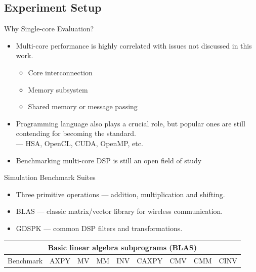 \documentclass{beamer}
\begin{document}
\begin{CJK}{UTF8}{bkai}
    \subsection{Experiment Setup}
    \begin{frame}{Why Single-core Evaluation?}
        \begin{itemize}
            \item Multi-core performance is highly correlated with issues not discussed in this work.
                \begin{itemize}
                    \item Core interconnection
                    \item Memory subsystem 
                    \item Shared memory or message passing
                \end{itemize}
            \item Programming language also plays a crucial role, but popular ones are still contending for becoming the standard. \\
                    --- HSA, OpenCL, CUDA, OpenMP, etc.
                \item Benchmarking multi-core DSP is still an open field of study~\cite{landscape}
        \end{itemize}       
    \end{frame}
    \begin{frame}{Simulation Benchmark Suites}
        \begin{itemize}
            \item Three primitive operations --- addition, multiplication and shifting.
            \item BLAS --- classic matrix/vector library for wireless communication.
            \item GDSPK --- common DSP filters and transformations.
        \end{itemize}
            \begin{table}[!ht]
                \centering
                \resizebox{\columnwidth}{!}
                {
                    \begin{tabular}{|c|c|c|c|c|c|c|c|c|}
                        \hline
                        \multicolumn{9}{|c|}{\textbf{Basic linear algebra subprograms (BLAS)}} \\ \hline
                        Benchmark              & AXPY   & MV     & MM      & INV      & CAXPY  & CMV  & CMM    & CINV  \\ \hline

\end{tabular}}
\end{table}
\end{frame}
\end{CJK}
\end{document}
